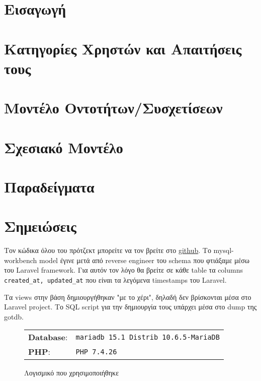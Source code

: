 \documentclass[12pt]{article}
\begin{document}
\maketitle \newpage
{}
\tableofcontents \newpage
\listoffigures
\listoftables
\newpage

\section{Εισαγωγή}


\section{Κατηγορίες Χρηστών και Απαιτήσεις τους}


\section{Μοντέλο Οντοτήτων/Συσχετίσεων}


\section{Σχεσιακό Μοντέλο}


\section{Παραδείγματα}



\section{Σημειώσεις}
Τον κώδικα όλου του πρότζεκτ μπορείτε να τον βρείτε στο \href{https://github.com/johnstef99/GoT-db-auth}{github}.
Το mysql-workbench model έγινε μετά από reverse engineer του schema που φτιάξαμε
μέσω του Laravel framework. Για αυτόν τον λόγο θα βρείτε σε κάθε table τα
columns \verb|created_at, updated_at| που είναι τα λεγόμενα timestamps του
Laravel.

Τα views στην βάση δημιουργήθηκαν "με το χέρι", δηλαδή δεν βρίσκονται μέσα στο
Laravel project. Το SQL script για την δημιουργία τους υπάρχει μέσα στο dump της
gotdb.

\begin{figure}[H]
	\centering
	\begin{tabular}{l l}
		\textbf{Database}: & \verb|mariadb 15.1 Distrib 10.6.5-MariaDB| \\
		\textbf{PHP}:      & \verb|PHP 7.4.26|
	\end{tabular}
	\caption{Λογισμικό που χρησιμοποιήθηκε}
\end{figure}
\end{document}
